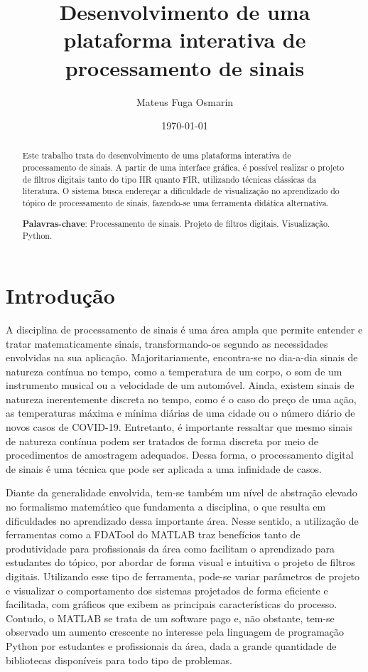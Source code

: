 \documentclass[12pt,a4paper]{report}
\title{Desenvolvimento de uma plataforma interativa de processamento de sinais}
\author{Mateus Fuga Osmarin}
\date{\today}
\begin{document}
\maketitle
\tableofcontents
\begin{abstract}
  Este trabalho trata do desenvolvimento de uma plataforma interativa de processamento de sinais.
  A partir de uma interface gráfica, é possível realizar o projeto de filtros digitais tanto do tipo
  IIR quanto FIR, utilizando técnicas clássicas da literatura. O sistema busca endereçar a dificuldade
  de visualização no aprendizado do tópico de processamento de sinais, fazendo-se uma ferramenta didática
  alternativa.

  \textbf{Palavras-chave}: Processamento de sinais. Projeto de filtros digitais. Visualização. Python.
\end{abstract}
\chapter{Introdução}
  A disciplina de processamento de sinais é uma área ampla que permite entender e tratar matematicamente
  sinais, transformando-os segundo as necessidades envolvidas na sua aplicação. Majoritariamente, encontra-se
  no dia-a-dia sinais de natureza contínua no tempo, como a temperatura de um corpo, o som de um instrumento
  musical ou a velocidade de um automóvel. Ainda, existem sinais de natureza inerentemente discreta no tempo,
  como é o caso do preço de uma ação, as temperaturas máxima e mínima diárias de uma cidade ou o número diário
  de novos casos de COVID-19. Entretanto, é importante ressaltar que mesmo sinais de natureza contínua  podem
  ser tratados de forma discreta por meio de procedimentos de amostragem adequados. Dessa forma, o processamento
  digital de sinais é uma técnica que pode ser aplicada a uma infinidade de casos.

  Diante da generalidade envolvida, tem-se também um nível de abstração elevado no formalismo matemático que
  fundamenta a disciplina, o que resulta em dificuldades no aprendizado dessa importante área. Nesse sentido,
  a utilização de ferramentas como a FDATool do MATLAB traz benefícios tanto de produtividade para profissionais
  da área como facilitam o aprendizado para estudantes do tópico, por abordar de forma visual e intuitiva o
  projeto de filtros digitais. Utilizando esse tipo de ferramenta, pode-se variar parâmetros de projeto e
  visualizar o comportamento dos sistemas projetados de forma eficiente e facilitada, com gráficos que exibem
  as principais características do processo. Contudo, o MATLAB se trata de um software pago e, não obstante,
  tem-se observado um aumento crescente no interesse pela linguagem de programação Python por estudantes e
  profissionais da área, dada a grande quantidade de bibliotecas disponíveis para todo tipo de problemas.
\end{document}
